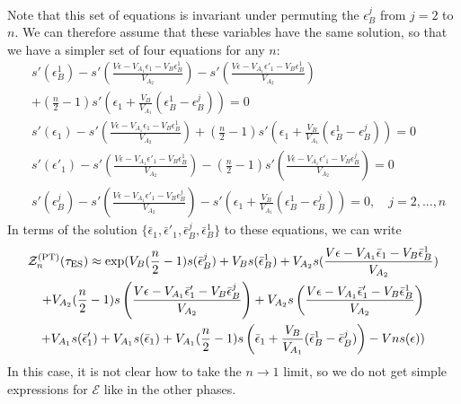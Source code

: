 \documentclass[a4paper,11pt]{article}
\newcommand{\be}{\begin{equation}}
\newcommand{\ee}{\end{equation}}
\newcommand\sE{{\ensuremath{{\mathcal E}}}}
\newcommand\sZ{{\mathcal Z}}
\begin{document}
\begin{enumerate}
\begin{appendix}
\begin{enumerate}
\begin{align}
\end{align} 
 Note that this set of equations is invariant under permuting the $\epsilon_{B}^j$ from $j=2$ to $n$. We can therefore assume that these variables have the same solution, so that we have a simpler set of four equations for any $n$: 
 \begin{align} 
 &s'(\epsilon_{B}^1) -s'\left(\frac{V\epsilon- V_{A_1} \epsilon_{1}- V_B\epsilon_{B}^1}{V_{A_2}} \right) - s'\left(\frac{V\epsilon -V_{A_1} \epsilon'_{1} - V_B\epsilon_{B}^1}{V_{A_2}} \right) \nonumber \\ &+ (\frac{n}{2}-1) s'\left( \epsilon_{1} + \frac{V_B}{V_{A_1}}(\epsilon_{B}^1- \epsilon_{B}^j)\right) = 0 \label{mices-1}\\
 &s'(\epsilon_{1}) -s'\left(\frac{V\epsilon - V_{A_1} \epsilon_{1}-V_B\epsilon_{B}^1}{V_{A_2}} \right) + (\frac{n}{2}-1)s'\left(\epsilon_{1}+\frac{V_B}{V_{A_1}}(\epsilon_{B}^1-\epsilon_{B}^j)\right) = 0\\
 &s'(\epsilon'_{1}) - s'\left(\frac{V\epsilon - V_{A_1} \epsilon'_{1} - V_B\epsilon_{B}^1}{V_{A_2}} \right)- (\frac{n}{2}-1)s'\left(\frac{V\epsilon - V_{A_1} \epsilon'_{1} - V_B\epsilon_{B}^j}{V_{A_2}} \right)=0 \\
 &s'(\epsilon_{B}^j) - s'\left(\frac{V\epsilon-V_{A_1} \epsilon'_{1}-V_B\epsilon_{B}^j}{V_{A_2}} \right) - s'\left(\epsilon_{1}+\frac{V_B}{V_{A_1}}(\epsilon_{B}^1-\epsilon_{B}^j)\right) = 0 , \quad j= 2, ..., n \label{mices-4}
 \end{align} 
 In terms of the solution $\{\bar\epsilon_{1}, \bar \epsilon'_{1}, \bar \epsilon_{B}^j, \bar \epsilon_{B}^1\}$ to these equations, we can write 
 \be
 \begin{gathered}
 \sZ_n^{\rm (PT)}(\tau_{\rm ES}) \approx \exp( V_B(\frac{n}{2}-1) s(\bar{\epsilon}_{B}^j) + V_B s(\bar{\epsilon}_{B}^1) + V_{A_2}s(\frac{V\epsilon- V_{A_1} \bar{\epsilon}_{1} - V_B \bar{\epsilon}_{B}^1}{V_{A_2}}) \\ + V_{A_2} (\frac{n}{2}-1) s\left(\frac{V\epsilon - V_{A_1} \bar{\epsilon}'_{1} - V_B\bar{\epsilon}_{B}^j}{V_{A_2}} \right)+V_{A_2} s\left(\frac{V\epsilon - V_{A_1} \bar{\epsilon}'_{1} - V_B\bar{\epsilon}_B^1}{V_{A_2}} \right)\\+V_{A_1} s(\bar{\epsilon}'_{1}) +V_{A_1} s(\bar{\epsilon}_{1}) + V_{A_1} (\frac{n}{2}-1) s\left(\bar{\epsilon}_{1}+\frac{V_B}{V_{A_1}}(\bar{\epsilon}_{B}^1-\bar{\epsilon}_{B}^j)\right)-V n s(\epsilon))
 \end{gathered} 
 \ee
In this case, it is not clear how to take the $n\rightarrow 1$ limit, so we do not get simple expressions for $\sE$ like in the other phases. 
 \end{enumerate} 
 

\end{appendix}
\end{enumerate}
\end{document}
